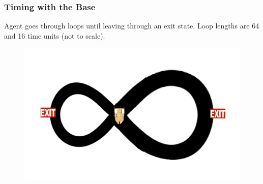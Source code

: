 \documentclass{beamer}
\begin{document}
\begin{frame}
\frametitle{Timing with the Base}
Agent goes through loops until leaving through an exit state.  Loop lengths are 64 and 16 time units (not to scale).
\begin{figure}
\includegraphics[width=0.8\linewidth]{lucasplots/monImages/doubleLoopImage.png}
\end{figure}
\end{frame}
\end{document}

